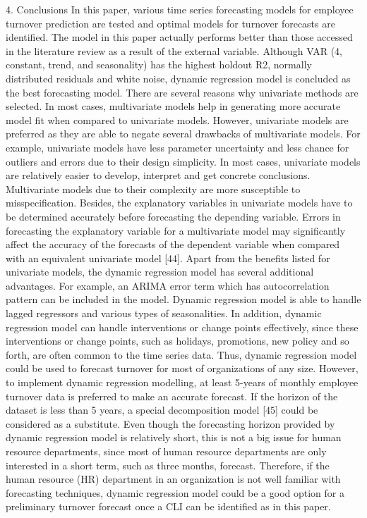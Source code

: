 4.    Conclusions
In this paper, various time series forecasting models for employee turnover prediction are tested and optimal models for turnover forecasts are identified. The model in this paper actually performs better than those accessed in the literature review as a result of the external variable. Although VAR (4, constant, trend, and seasonality) has the highest holdout R2, normally distributed residuals and white noise, dynamic regression model is concluded as the best forecasting model. There are several reasons why univariate methods are selected. In most cases, multivariate models help in generating more accurate model fit when compared to univariate models. However, univariate models are preferred as they are able to negate several drawbacks of multivariate models. For example, univariate models have less parameter uncertainty and less chance for outliers and errors due to their design simplicity. In most cases, univariate models are relatively easier to develop, interpret and get concrete conclusions. Multivariate models due to their complexity are more susceptible to misspecification. Besides, the explanatory variables in univariate models have to be determined accurately before forecasting the depending variable. Errors in forecasting the explanatory variable for a multivariate model may significantly affect the accuracy of the forecasts of the dependent variable when compared with an equivalent univariate model [44]. Apart from the benefits listed for univariate models, the dynamic regression model has several additional advantages. For example, an ARIMA error term which has autocorrelation pattern can be included in the model. Dynamic regression model is able to handle lagged regressors and various types of seasonalities. In addition, dynamic regression model can handle interventions or change points effectively, since these interventions or change points, such as holidays, promotions, new policy and so forth, are often common to the time series data. Thus, dynamic regression model could be used to forecast turnover for most of organizations of any size. However, to implement dynamic regression modelling, at least 5-years of monthly employee turnover data is preferred to make an accurate forecast. If the horizon of the dataset is less than 5 years, a special decomposition model [45] could be considered as a substitute. Even though the forecasting horizon provided by dynamic regression model is relatively short, this is not a big issue for human resource departments, since most of human resource departments are only interested in a short term, such as three months, forecast. Therefore, if the human resource (HR) department in an organization is not well familiar with forecasting techniques, dynamic regression model could be a good option for a preliminary turnover forecast once a CLI can be identified as in this paper. 
